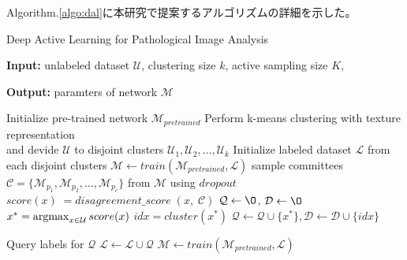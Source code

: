 Algorithm.\ref{algo:dal}に本研究で提案するアルゴリズムの詳細を示した。


\begin{algorithm}[h]
    \caption{Deep Active Learning for Pathological Image Analysis}
    \label{algo:dal}
    \begin{algorithmic}
        \STATE \textbf{Input: } 
        unlabeled dataset $\mathcal{U}$,
        clustering size $k$, 
        active sampling size $K$,
    \end{algorithmic}

    \begin{algorithmic}
        \STATE \textbf{Output: } paramters of network $\mathcal{M}$
    \end{algorithmic}
    
    \begin{algorithmic}[1]
        \STATE Initialize pre-trained network $\mathcal{M}_{pretrained}$
        \STATE Perform k-means clustering with texture representation \\
        and devide $\mathcal{U}$ to disjoint clusters $\mathcal{U}_1, \mathcal{U}_2, \dots, \mathcal{U}_k$
        \STATE Initialize labeled dataset $\mathcal{L}$ from each disjoint clusters
        \STATE $\mathcal{M} \leftarrow train (\mathcal{M}_{pretrained}, \mathcal{L})$
        \REPEAT
            \STATE sample committees $\mathcal{C} = \{\mathcal{M}_{p_1}, \mathcal{M}_{p_2}, \dots, \mathcal{M}_{p_c} \}$ from $\mathcal{M}$ using $dropout$ 
                \STATE $score (x) \; = disagreement\_score \; (x, \; \mathcal{C}) $
            \ENDFOR
            \STATE $\mathcal{Q} \leftarrow \O$, $\mathcal{D} \leftarrow \O$
            \STATE $x^{\ast} = \argmax_{x \in \mathcal{U}} score(x)$
            \STATE $idx = cluster(x^{\ast})$
            \STATE $\mathcal{Q} \leftarrow \mathcal{Q} \cup \{x^{\ast}\}, \mathcal{D} \leftarrow \mathcal{D} \cup \{idx\}$

            \ENDIF

            \ENDWHILE
            \STATE Query labels for $\mathcal{Q}$
            \STATE $\mathcal{L} \leftarrow \mathcal{L} \cup \mathcal{Q}$
            \STATE $\mathcal{M} \leftarrow train (\mathcal{M}_{pretrained}, \mathcal{L})$

    \end{algorithmic}
  \end{algorithm}
  